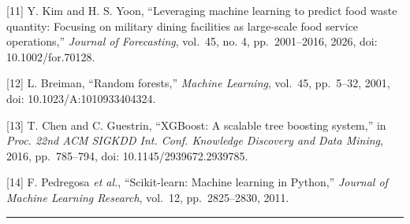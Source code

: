 \documentclass[conference]{IEEEtran}
\begin{document}
{[}11{]} Y. Kim and H. S. Yoon, ``Leveraging machine learning to predict
food waste quantity: Focusing on military dining facilities as
large-scale food service operations,'' \emph{Journal of Forecasting},
vol.~45, no. 4, pp.~2001--2016, 2026, doi: 10.1002/for.70128.

{[}12{]} L. Breiman, ``Random forests,'' \emph{Machine Learning},
vol.~45, pp.~5--32, 2001, doi: 10.1023/A:1010933404324.

{[}13{]} T. Chen and C. Guestrin, ``XGBoost: A scalable tree boosting
system,'' in \emph{Proc. 22nd ACM SIGKDD Int. Conf. Knowledge Discovery
and Data Mining}, 2016, pp.~785--794, doi: 10.1145/2939672.2939785.

{[}14{]} F. Pedregosa \emph{et al.}, ``Scikit-learn: Machine learning in
Python,'' \emph{Journal of Machine Learning Research}, vol.~12,
pp.~2825--2830, 2011.

\begin{center}\rule{0.5\linewidth}{0.5pt}\end{center}
\end{document}
